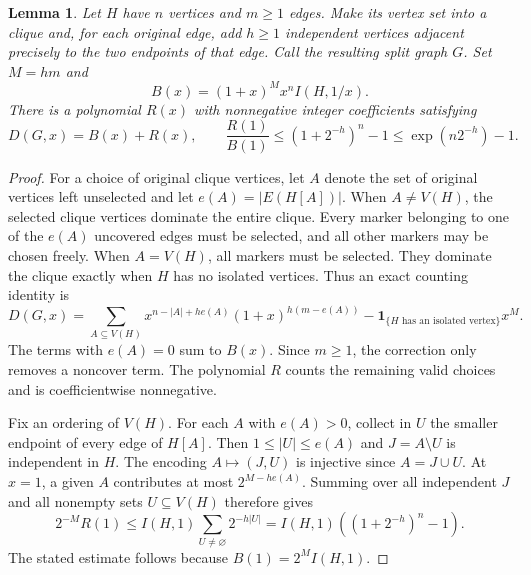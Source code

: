 \documentclass[11pt,a4paper]{article}
\newtheorem{lemma}[theorem]{Lemma}
\begin{document}
\begin{lemma}\label{lem:ordinary-marker-error}
Let $H$ have $n$ vertices and $m\ge1$ edges. Make its vertex set into
a clique and, for each original edge, add $h\ge1$ independent vertices
adjacent precisely to the two endpoints of that edge. Call the resulting
split graph $G$. Set $M=hm$ and
\[
 B(x)=(1+x)^M x^n I(H,1/x).
\]
There is a polynomial $R(x)$ with nonnegative integer coefficients
satisfying
\[
 D(G,x)=B(x)+R(x),\qquad
 \frac{R(1)}{B(1)}\le(1+2^{-h})^n-1\le\exp(n2^{-h})-1.
\]
\end{lemma}
\begin{proof}
For a choice of original clique vertices, let $A$ denote the set of
original vertices left unselected and let $e(A)=|E(H[A])|$. When
$A\ne V(H)$, the selected clique vertices dominate the entire clique.
Every marker belonging to one of the $e(A)$ uncovered edges must be
selected, and all other markers may be chosen freely. When $A=V(H)$,
all markers must be selected. They dominate the clique exactly when
$H$ has no isolated vertices. Thus an exact counting identity is
\[
 D(G,x)=\sum_{A\subseteq V(H)}
   x^{n-|A|+he(A)}(1+x)^{h(m-e(A))}
 -\boldsymbol{1}_{\{H\text{ has an isolated vertex}\}} x^M.
\]
The terms with $e(A)=0$ sum to $B(x)$. Since $m\ge1$, the correction
only removes a noncover term. The polynomial $R$ counts the remaining
valid choices and is coefficientwise nonnegative.

Fix an ordering of $V(H)$. For each $A$ with $e(A)>0$, collect in
$U$ the smaller endpoint of every edge of $H[A]$. Then $1\le |U|\le e(A)$
and $J=A\setminus U$ is independent in $H$. The encoding $A\mapsto(J,U)$
is injective since $A=J\cup U$. At $x=1$, a given $A$ contributes at
most $2^{M-he(A)}$. Summing over all independent $J$ and all nonempty
sets $U\subseteq V(H)$ therefore gives
\[
 2^{-M}R(1)\le I(H,1)\sum_{U\ne\varnothing}2^{-h|U|}
   =I(H,1)((1+2^{-h})^n-1).
\]
The stated estimate follows because $B(1)=2^M I(H,1)$.
\end{proof}
\end{document}
